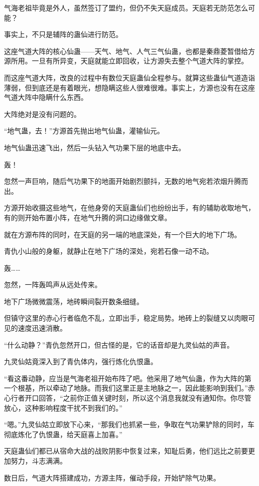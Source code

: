 \begin{this_body}
气海老祖毕竟是外人，虽然签订了盟约，但仍不失天庭成员。天庭若无防范怎么可能？

事实上，不只是辅阵的蛊仙进行防范。

这座气道大阵的核心仙蛊——天气、地气、人气三气仙蛊，也都是秦鼎菱暂借给方源所用。一旦有所异变，天庭就能立即回收，让方源失去整个气道大阵的掌控。

而这座气道大阵，改良的过程中有数位天庭蛊仙全程参与。就算这些蛊仙气道造诣薄弱，但到底还是有着眼光，想隐瞒这些人很难很难。事实上，方源也没有在这座气道大阵中隐瞒什么东西。

大阵绝对是没有问题的。

“地气蛊，去！”方源首先抛出地气仙蛊，灌输仙元。

地气仙蛊迅速飞出，然后一头钻入气功果下层的地底中去。

轰！

忽然一声巨响，随后气功果下的地面开始剧烈颤抖，无数的地气宛若浓烟升腾而出。

方源开始收摄这些地气，在他身旁的天庭蛊仙们也纷纷出手，有的辅助收取地气，有的则开始布置小阵，在地气升腾的洞口边缘做文章。

就在方源布阵的同时，在天庭的另一端的地底深处，有一个巨大的地下广场。

青仇小山般的身躯，就静止在地下广场的深处，宛若石像一动不动。

轰……

忽然，一阵轰鸣声从远处传来。

地下广场微微震荡，地砖瞬间裂开数条细缝。

但镇守这里的赤心行者临危不乱，立即出手，稳定局势。地砖上的裂缝又以肉眼可见的速度迅速消散。

“什么动静？”青仇忽然开口，但古怪的是，它的话音却是九灵仙姑的声音。

九灵仙姑竟深入到了青仇体内，强行炼化仇恨蛊。

“看这番动静，应当是气海老祖开始布阵了吧。他采用了地气仙蛊，作为大阵的第一个根基，所以牵动了地脉。而我们这里正是主地脉之一，因此能影响到我们。”赤心行者开口回答，“之前你正值关键时刻，所以这个消息我就没有通知你。你尽管放心，这种影响程度干扰不到我们的。”

“嗯。”九灵仙姑立即放下心来，“那我们也抓紧一些，争取在气功果铲除的同时，车彻底炼化了仇恨蛊，给天庭喜上加喜。”

天庭蛊仙们都已从宿命大战的战败阴影中恢复过来，知耻后勇，他们远比之前要更加努力，斗志满满。

数日后，气道大阵搭建成功，方源主阵，催动手段，开始铲除气功果。


\end{this_body}
